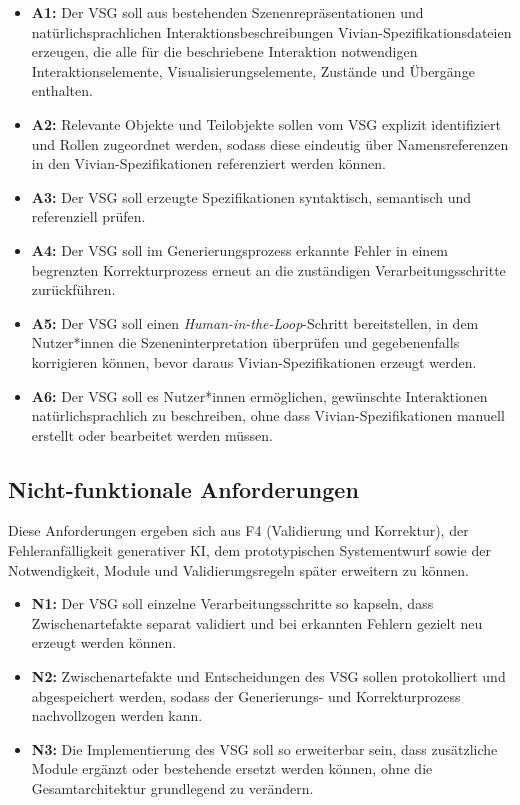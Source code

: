 \begin{itemize}
	\item \textbf{A1:} Der VSG soll aus bestehenden Szenenrepräsentationen und natürlichsprachlichen Interaktionsbeschreibungen Vivian-Spezifikationsdateien erzeugen, die alle für die beschriebene Interaktion notwendigen Interaktionselemente, Visualisierungselemente, Zustände und Übergänge enthalten.
	\item \textbf{A2:} Relevante Objekte und Teilobjekte sollen vom VSG explizit identifiziert und Rollen zugeordnet werden, sodass diese eindeutig über Namensreferenzen in den Vivian-Spezifikationen referenziert werden können.
	\item \textbf{A3:} Der VSG soll erzeugte Spezifikationen syntaktisch, semantisch und referenziell prüfen.
	\item \textbf{A4:} Der VSG soll im Generierungsprozess erkannte Fehler in einem begrenzten Korrekturprozess erneut an die zuständigen Verarbeitungsschritte zurückführen.
	\item \textbf{A5:} Der VSG soll einen \textit{Human-in-the-Loop}-Schritt bereitstellen, in dem Nutzer*innen die Szeneninterpretation überprüfen und gegebenenfalls korrigieren können, bevor daraus Vivian-Spezifikationen erzeugt werden. %
	\item \textbf{A6:} Der VSG soll es Nutzer*innen ermöglichen, gewünschte Interaktionen natürlichsprachlich zu beschreiben, ohne dass Vivian-Spezifikationen manuell erstellt oder bearbeitet werden müssen. %
\end{itemize}

\subsection{Nicht-funktionale Anforderungen}
Diese Anforderungen ergeben sich aus F4 (Validierung und Korrektur), der Fehleranfälligkeit generativer KI, dem prototypischen Systementwurf sowie der Notwendigkeit, Module und Validierungsregeln später erweitern zu können.

\begin{itemize}
	\item \textbf{N1:} Der VSG soll einzelne Verarbeitungsschritte so kapseln, dass Zwischenartefakte separat validiert und bei erkannten Fehlern gezielt neu erzeugt werden können.
	\item \textbf{N2:} Zwischenartefakte und Entscheidungen des VSG sollen protokolliert und abgespeichert werden, sodass der Generierungs- und Korrekturprozess nachvollzogen werden kann.
	\item \textbf{N3:} Die Implementierung des VSG soll so erweiterbar sein, dass zusätzliche Module ergänzt oder bestehende ersetzt werden können, ohne die Gesamtarchitektur grundlegend zu verändern.
\end{itemize}


